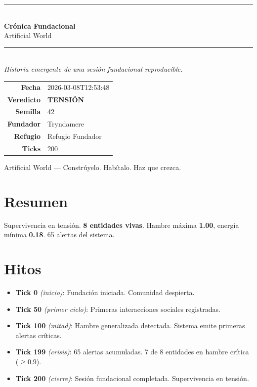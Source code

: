 \documentclass[12pt,a4paper]{article}
\begin{document}
\begin{titlepage}
  \centering
  \vspace*{2.5cm}
  {\color{accent}\rule{\linewidth}{2pt}}\\[0.8em]
  {\Huge\bfseries\color{accent} Cr\'onica Fundacional}\\[0.5em]
  {\Large\color{textmuted} Artificial World}\\[0.4em]
  {\color{accent}\rule{\linewidth}{2pt}}\\[1.5em]

  \textit{\large Historia emergente de una sesi\'on fundacional reproducible.}

  \vspace{2cm}

  \begin{tabular}{rl}
    \textbf{Fecha}     & 2026-03-08T12:53:48 \\[4pt]
    \textbf{Veredicto} & \textcolor{warncolor}{\textbf{TENSI\'ON}} \\[4pt]
    \textbf{Semilla}   & 42 \\[4pt]
    \textbf{Fundador}  & Tryndamere \\[4pt]
    \textbf{Refugio}   & Refugio Fundador \\[4pt]
    \textbf{Ticks}     & 200 \\
  \end{tabular}

  \vfill
  {\small\color{textmuted}
    Artificial World --- Constr\'uyelo. Hab\'italo. Haz que crezca.
  }
\end{titlepage}

\section*{Resumen}

\noindent\colorbox{cyan!10}{\parbox{\dimexpr\linewidth-2\fboxsep\relax}{%
  Supervivencia en tensi\'on. \textbf{8 entidades vivas}.
  Hambre m\'axima \textcolor{critcolor}{\textbf{1.00}},
  energ\'ia m\'inima \textcolor{warncolor}{\textbf{0.18}}.
  65 alertas del sistema.
}}

\section*{Hitos}

\begin{itemize}[leftmargin=1.5em, itemsep=4pt]
  \item \textbf{Tick 0} \textit{(inicio)}: Fundaci\'on iniciada. Comunidad despierta.
  \item \textbf{Tick 50} \textit{(primer ciclo)}: Primeras interacciones sociales registradas.
  \item \textbf{Tick 100} \textit{(mitad)}: Hambre generalizada detectada. Sistema emite primeras alertas cr\'iticas.
  \item \textbf{Tick 199} \textit{(crisis)}: 65 alertas acumuladas. 7 de 8 entidades en hambre cr\'itica ($\geq 0.9$).
  \item \textbf{Tick 200} \textit{(cierre)}: Sesi\'on fundacional completada. Supervivencia en tensi\'on.
\end{itemize}
\end{document}
